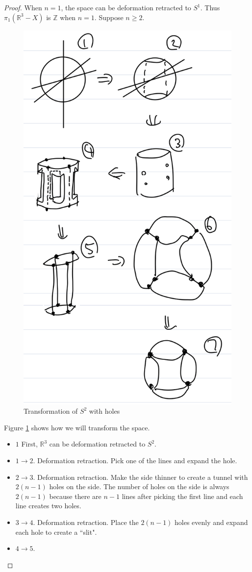 \documentclass[12pt, psamsfonts]{amsart}
\theoremstyle{definition}
\theoremstyle{remark}
\numberwithin{equation}{section}
\begin{document}
\begin{proof}
  When $n = 1$, the space can be deformation retracted to $S^1$.
  Thus $\pi_1(\mathbb{R}^3 - X)$ is $\mathbb{Z}$ when $n = 1$.
  Suppose $n \geq 2$.

  \begin{figure}
    \includegraphics[width=.5\linewidth]{sphere_lines.jpeg}
      \caption{Transformation of $S^2$ with holes}
    \label{fig:transformation}
  \end{figure}
  Figure \ref{fig:transformation} shows how we will transform the space.
  \begin{itemize}
    \item
      $1$
      First, $\mathbb{R}^3$ can be deformation retracted to $S^2$.
    \item
      $1 \rightarrow 2$.
      Deformation retraction.
      Pick one of the lines and expand the hole.
    \item
      $2 \rightarrow 3$.
      Deformation retraction.
      Make the side thinner to create a tunnel with $2(n - 1)$ holes on the side.
      The number of holes on the side is always $2(n - 1)$ because there are $n - 1$ lines after picking the first line and each line creates two holes.
    \item
      $3 \rightarrow 4$.
      Deformation retraction.
      Place the $2(n - 1)$ holes evenly and expand each hole to create a ``slit".
    \item
      $4 \rightarrow 5$.

\end{itemize}
\end{proof}
\end{document}
